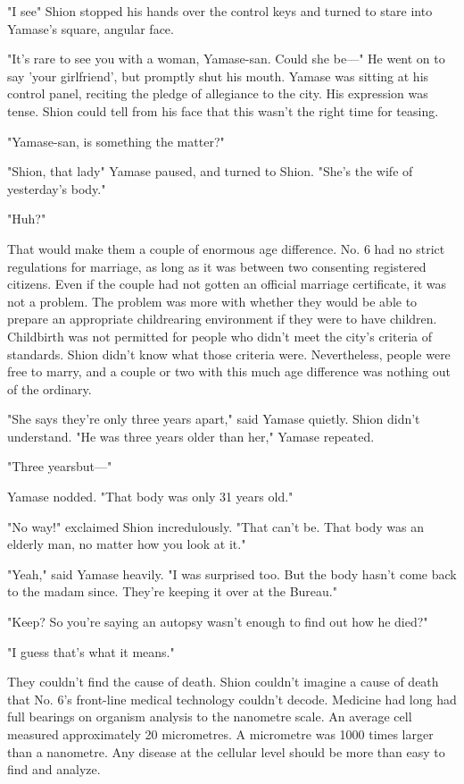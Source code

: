 "I see\el " Shion stopped his hands over the control keys and turned to
stare into Yamase's square, angular face.

"It's rare to see you with a woman, Yamase-san. Could she be---" He went
on to say 'your girlfriend', but promptly shut his mouth. Yamase was
sitting at his control panel, reciting the pledge of allegiance to the
city. His expression was tense. Shion could tell from his face that this
wasn't the right time for teasing.

"Yamase-san, is something the matter?"

"Shion, that lady\el " Yamase paused, and turned to Shion. "She's the
wife of yesterday's body."

"Huh?"

That would make them a couple of enormous age difference. No. 6 had no
strict regulations for marriage, as long as it was between two
consenting registered citizens. Even if the couple had not gotten an
official marriage certificate, it was not a problem. The problem was
more with whether they would be able to prepare an appropriate
childrearing environment if they were to have children. Childbirth was
not permitted for people who didn't meet the city's criteria of
standards. Shion didn't know what those criteria were. Nevertheless,
people were free to marry, and a couple or two with this much age
difference was nothing out of the ordinary.

"She says they're only three years apart," said Yamase quietly. Shion
didn't understand. "He was three years older than her," Yamase repeated.

"Three years\el but---"

Yamase nodded. "That body was only 31 years old."

"No way!" exclaimed Shion incredulously. "That can't be. That body was
an elderly man, no matter how you look at it."

"Yeah," said Yamase heavily. "I was surprised too. But the body hasn't
come back to the madam since. They're keeping it over at the Bureau."

"Keep? So you're saying an autopsy wasn't enough to find out how he
died?"

"I guess that's what it means."

They couldn't find the cause of death. Shion couldn't imagine a cause of
death that No. 6's front-line medical technology couldn't decode.
Medicine had long had full bearings on organism analysis to the
nanometre scale. An average cell measured approximately 20 micrometres.
A micrometre was 1000 times larger than a nanometre. Any disease at the
cellular level should be more than easy to find and analyze.

